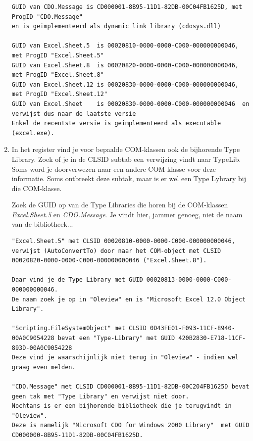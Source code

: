 \documentclass[11pt,a4paper]{report}
\begin{document}
\begin{enumerate}
\begin{lstlisting}
GUID van CDO.Message is CD000001-8B95-11D1-82DB-00C04FB1625D, met ProgID "CDO.Message" 
en is geimplementeerd als dynamic link library (cdosys.dll)

GUID van Excel.Sheet.5  is 00020810-0000-0000-C000-000000000046, met ProgID "Excel.Sheet.5"
GUID van Excel.Sheet.8  is 00020820-0000-0000-C000-000000000046, met ProgID "Excel.Sheet.8"
GUID van Excel.Sheet.12 is 00020830-0000-0000-C000-000000000046, met ProgID "Excel.Sheet.12"
GUID van Excel.Sheet    is 00020830-0000-0000-C000-000000000046  en verwijst dus naar de laatste versie
Enkel de recentste versie is geimplementeerd als executable (excel.exe).
\end{lstlisting}
\newpage
	\item In het register vind je voor bepaalde COM-klassen ook de bijhorende Type Library. Zoek of je in de CLSID subtab een verwijzing vindt naar TypeLib. Soms word je doorverwezen naar een andere COM-klasse voor deze informatie. Soms ontbreekt deze subtak, maar is er wel een Type Lybrary bij die COM-klasse.
	\par Zoek de GUID op van de Type Libraries die horen bij de COM-klassen \textit{Excel.Sheet.5} en \textit{CDO.Message}. Je vindt hier, jammer genoeg, niet de naam van de bibliotheek...
	\\
\begin{lstlisting}
"Excel.Sheet.5" met CLSID 00020810-0000-0000-C000-000000000046, 
verwijst (AutoConvertTo) door naar het COM-object met CLSID 00020820-0000-0000-C000-000000000046 ("Excel.Sheet.8").

Daar vind je de Type Library met GUID 00020813-0000-0000-C000-000000000046. 
De naam zoek je op in "Oleview" en is "Microsoft Excel 12.0 Object Library".

"Scripting.FileSystemObject" met CLSID 0D43FE01-F093-11CF-8940-00A0C9054228 bevat een "Type-Library" met GUID 420B2830-E718-11CF-893D-00A0C9054228
Deze vind je waarschijnlijk niet terug in "Oleview" - indien wel graag even melden.

"CDO.Message" met CLSID CD000001-8B95-11D1-82DB-00C204FB1625D bevat geen tak met "Type Library" en verwijst niet door.
Nochtans is er een bijhorende bibliotheek die je terugvindt in  "Oleview". 
Deze is namelijk "Microsoft CDO for Windows 2000 Library"  met GUID CD000000-8B95-11D1-82DB-00C04FB1625D.

\end{lstlisting}
\end{enumerate}
\end{document}
